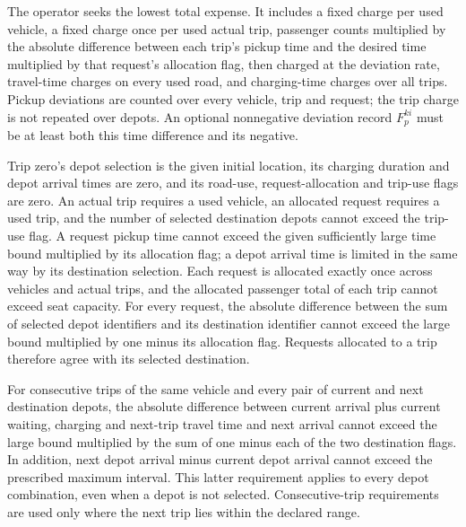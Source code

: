 \documentclass[10pt]{article}
\begin{document}
The operator seeks the lowest total expense. It includes a fixed charge per used vehicle, a fixed charge once per used actual trip, passenger counts multiplied by the absolute difference between each trip's pickup time and the desired time multiplied by that request's allocation flag, then charged at the deviation rate, travel-time charges on every used road, and charging-time charges over all trips. Pickup deviations are counted over every vehicle, trip and request; the trip charge is not repeated over depots. An optional nonnegative deviation record $F_p^{ki}$ must be at least both this time difference and its negative.

Trip zero's depot selection is the given initial location, its charging duration and depot arrival times are zero, and its road-use, request-allocation and trip-use flags are zero. An actual trip requires a used vehicle, an allocated request requires a used trip, and the number of selected destination depots cannot exceed the trip-use flag. A request pickup time cannot exceed the given sufficiently large time bound multiplied by its allocation flag; a depot arrival time is limited in the same way by its destination selection. Each request is allocated exactly once across vehicles and actual trips, and the allocated passenger total of each trip cannot exceed seat capacity. For every request, the absolute difference between the sum of selected depot identifiers and its destination identifier cannot exceed the large bound multiplied by one minus its allocation flag. Requests allocated to a trip therefore agree with its selected destination.

For consecutive trips of the same vehicle and every pair of current and next destination depots, the absolute difference between current arrival plus current waiting, charging and next-trip travel time and next arrival cannot exceed the large bound multiplied by the sum of one minus each of the two destination flags. In addition, next depot arrival minus current depot arrival cannot exceed the prescribed maximum interval. This latter requirement applies to every depot combination, even when a depot is not selected. Consecutive-trip requirements are used only where the next trip lies within the declared range.
\end{document}
